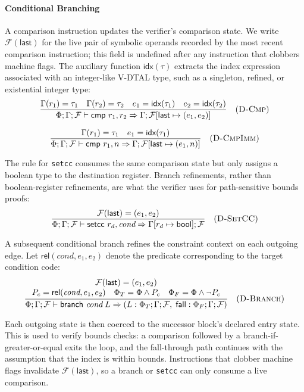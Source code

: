 \paragraph{Conditional Branching}
A comparison instruction updates the verifier's comparison state. We write $\mathcal{F}(\textsf{last})$ for the live pair of symbolic operands recorded by the most recent comparison instruction; this field is undefined after any instruction that clobbers machine flags. The auxiliary function $\textsf{idx}(\tau)$ extracts the index expression associated with an integer-like V-DTAL type, such as a singleton, refined, or existential integer type:
$$
\frac{
  \Gamma(r_1) = \tau_1 \quad \Gamma(r_2) = \tau_2 \quad e_1=\textsf{idx}(\tau_1) \quad e_2=\textsf{idx}(\tau_2)
}{\Phi; \Gamma; \mathcal{F} \vdash \textsf{cmp } r_1, r_2 \Rightarrow \Gamma; \mathcal{F}[\textsf{last} \mapsto (e_1,e_2)]} \quad (\textsc{D-Cmp})
$$

$$
\frac{
  \Gamma(r_1) = \tau_1 \quad e_1=\textsf{idx}(\tau_1)
}{\Phi; \Gamma; \mathcal{F} \vdash \textsf{cmp } r_1, n \Rightarrow \Gamma; \mathcal{F}[\textsf{last} \mapsto (e_1,n)]} \quad (\textsc{D-CmpImm})
$$

\noindent The rule for \texttt{setcc} consumes the same comparison state but only assigns a boolean type to the destination register. Branch refinements, rather than boolean-register refinements, are what the verifier uses for path-sensitive bounds proofs:
$$
\frac{
  \mathcal{F}(\textsf{last}) = (e_1,e_2)
}{\Phi; \Gamma; \mathcal{F} \vdash \textsf{setcc } r_d, \textit{cond} \Rightarrow \Gamma[r_d \mapsto \textsf{bool}]; \mathcal{F}} \quad (\textsc{D-SetCC})
$$

A subsequent conditional branch refines the constraint context on each outgoing edge. Let $\mathsf{rel}(\textit{cond}, e_1, e_2)$ denote the predicate corresponding to the target condition code:
$$
\frac{
  \begin{array}{c}
    \mathcal{F}(\textsf{last}) = (e_1,e_2) \\
    P_c = \mathsf{rel}(\textit{cond}, e_1, e_2) \quad
    \Phi_T = \Phi \wedge P_c \quad
    \Phi_F = \Phi \wedge \neg P_c
  \end{array}
}{
  \Phi; \Gamma; \mathcal{F} \vdash \textsf{branch } \textit{cond}\; L
  \Rightarrow
  (L: \Phi_T; \Gamma; \mathcal{F},\; \mathsf{fall}: \Phi_F; \Gamma; \mathcal{F})
} \quad (\textsc{D-Branch})
$$

\noindent Each outgoing state is then coerced to the successor block's declared entry state. This is used to verify bounds checks: a comparison followed by a branch-if-greater-or-equal exits the loop, and the fall-through path continues with the assumption that the index is within bounds. Instructions that clobber machine flags invalidate $\mathcal{F}(\textsf{last})$, so a branch or \texttt{setcc} can only consume a live comparison.

